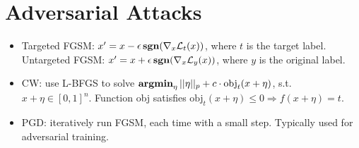 \section{Adversarial Attacks}

\begin{itemize}
    \item Targeted FGSM: $x^\prime = x - \epsilon \operatorname{\textbf{sgn}}(\nabla_x \mathcal{L}_t(x))$, where $t$ is the target label. Untargeted FGSM: $x^\prime = x + \epsilon \operatorname{\textbf{sgn}}(\nabla_x \mathcal{L}_y (x))$, where $y$ is the original label.
    \item CW: use L-BFGS to solve $\operatorname{\textbf{argmin}}_\eta ||\eta||_p+c\cdot \text{obj}_t(x+\eta)$, s.t. $x+\eta\in [0,1]^n$. Function obj satisfies $\text{obj}_t(x+\eta)\le 0 \Rightarrow f(x+\eta)=t$.
    \item PGD: iteratively run FGSM, each time with a small step. Typically used for adversarial training.
\end{itemize}